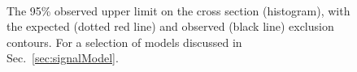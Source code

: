 \begin{figure}[h!]
\begin{center}
    \label{fig:T2bb}
     ~~
    \label{fig:T1bbbb}
     \\
    \caption{
      The 95\% observed upper limit on the cross section (histogram),
      with the expected (dotted red line) and observed (black line)
      exclusion contours. For a selection of \SUSY models discussed in
      Sec.~\ref{sec:signalModel}.
    }
    \label{fig:T1tttt}
  \end{center}
\end{figure}



